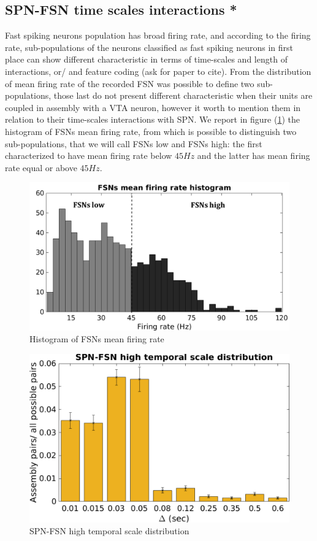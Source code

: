 \subsection{SPN-FSN time scales interactions *}
Fast spiking neurons population has broad firing rate, and according to the firing rate, sub-populations of the neurons classified as fast spiking neurons in first place can show different characteristic in terms of time-scales and length of interactions, or/ and feature coding ({\color{red}ask for paper to cite}). From the distribution of mean firing rate of the recorded FSN was possible to define two sub-populations, those last do not present different characteristic when their units are coupled in assembly with a VTA neuron, however it worth to mention them in relation to their time-scales interactions with SPN. We report in figure (\ref{fig:FSNsFireHisto}) the histogram of FSNs mean firing rate, from which is possible to distinguish two sub-populations, that we will call FSNs low and FSNs high: the first characterized to have mean firing rate below $45 Hz$ and the latter has mean firing rate equal or above $45 Hz$. 
\begin{figure}
    \centering
    \includegraphics[scale=0.6]{figures/FSNFiringRateLightDark.pdf}
    \caption{Histogram of FSNs mean firing rate}
    \label{fig:FSNsFireHisto}
\end{figure}
\begin{figure}
    \centering
    \includegraphics[scale=0.5]{figures/SPN_FSNhigh1.pdf}
    \caption{SPN-FSN high temporal scale distribution}
    \label{fig:SPN_FSNhighBin}
\end{figure}
